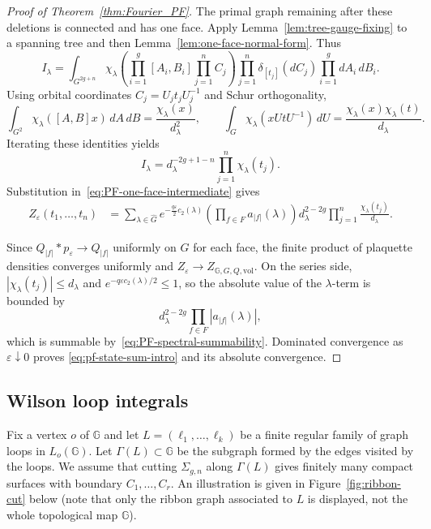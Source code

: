 \documentclass[11pt,a4paper,reqno]{article}
\theoremstyle{definition}
\theoremstyle{remark}
\newcommand\vol{\mathrm{vol}}
\newcommand\Gbb{{\mathbb{G}}}
\begin{document}
\begin{proof}[Proof of Theorem~\ref{thm:Fourier_PF}]
The primal graph remaining after these deletions is connected and has one
face. Apply Lemma~\ref{lem:tree-gauge-fixing} to a spanning tree and then
Lemma~\ref{lem:one-face-normal-form}. Thus
\[
 I_\lambda
 =
 \int_{G^{2g+n}}
 \chi_\lambda\!\left(
 \prod_{i=1}^g[A_i,B_i]\prod_{j=1}^n C_j
 \right)
 \prod_{j=1}^n\delta_{[t_j]}(dC_j)
 \prod_{i=1}^g dA_i\,dB_i.
\]
Using orbital coordinates $C_j=U_jt_jU_j^{-1}$ and Schur orthogonality,
\[
 \int_{G^2}\chi_\lambda([A,B]x)\,dA\,dB
 =\frac{\chi_\lambda(x)}{d_\lambda^2},
 \qquad
 \int_G\chi_\lambda(xUtU^{-1})\,dU
 =\frac{\chi_\lambda(x)\chi_\lambda(t)}{d_\lambda}.
\]
Iterating these identities yields
\[
 I_\lambda
 =d_\lambda^{-2g+1-n}
 \prod_{j=1}^n\chi_\lambda(t_j).
\]
Substitution in~\eqref{eq:PF-one-face-intermediate} gives
\begin{align*}
 Z_\varepsilon(t_1,\ldots,t_n)
 &=
 \sum_{\lambda\in\widehat G}
 e^{-\frac{q\varepsilon}{2}c_2(\lambda)}
 \left(\prod_{f\in F}a_{|f|}(\lambda)\right)
 d_\lambda^{2-2g}
 \prod_{j=1}^n\frac{\chi_\lambda(t_j)}{d_\lambda}.
\end{align*}

Since $Q_{|f|}*p_\varepsilon\to Q_{|f|}$ uniformly on $G$ for each
face, the finite product of plaquette densities converges uniformly and
$Z_\varepsilon\to Z_{\mathbb G,G,Q,\vol}$. On the series side,
$|\chi_\lambda(t_j)|\leq d_\lambda$ and
$e^{-q\varepsilon c_2(\lambda)/2}\leq1$, so the absolute value of the
$\lambda$-term is bounded by
\[
 d_\lambda^{2-2g}
 \prod_{f\in F}|a_{|f|}(\lambda)|,
\]
which is summable by~\eqref{eq:PF-spectral-summability}. Dominated
convergence as $\varepsilon\downarrow0$ proves
\eqref{eq:pf-state-sum-intro} and its absolute convergence.
\end{proof}

\subsection{Wilson loop integrals}

Fix a vertex $o$ of $\mathbb G$ and let $L=(\ell_1,\ldots,\ell_k)$ be a finite regular family of graph loops in $L_o(\mathbb G)$. Let $\Gamma(L)\subset \mathbb G$ be the subgraph formed by the edges visited by the loops. We assume that cutting $\Sigma_{g,n}$ along $\Gamma(L)$ gives finitely many compact surfaces with boundary $C_1,\ldots,C_r .$ An illustration is given in Figure~\ref{fig:ribbon-cut} below (note that only the ribbon graph associated to $L$ is displayed, not the whole topological map $\Gbb$).
\end{document}
